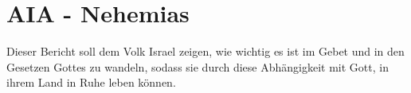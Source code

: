 \documentclass[12pt]{../../../inc/mybib}
\begin{document}
    \section{AIA - Nehemias}

    Dieser Bericht soll dem Volk Israel zeigen, wie wichtig es ist im Gebet und in den Gesetzen Gottes zu wandeln,
    sodass sie durch diese Abhängigkeit mit Gott, in ihrem Land in Ruhe leben können.

    
\end{document}
